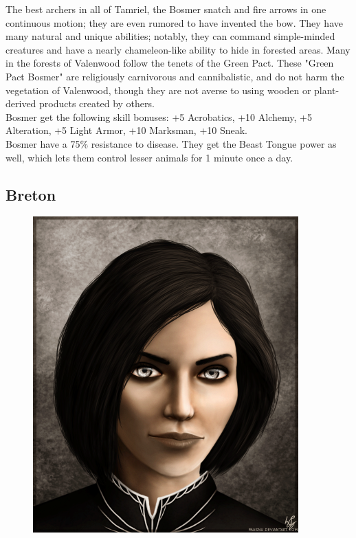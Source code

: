 \documentclass[12pt]{book}
\begin{document}
The best archers in all of Tamriel, the Bosmer snatch and fire arrows in one continuous motion; they are even rumored to have invented the bow. They have many natural and unique abilities; notably, they can command simple-minded creatures and have a nearly chameleon-like ability to hide in forested areas. Many in the forests of Valenwood follow the tenets of the Green Pact. These "Green Pact Bosmer" are religiously carnivorous and cannibalistic, and do not harm the vegetation of Valenwood, though they are not averse to using wooden or plant-derived products created by others.\\

Bosmer get the following skill bonuses: +5 Acrobatics, +10 Alchemy, +5 Alteration, +5 Light Armor, +10 Marksman, +10 Sneak.\\

Bosmer have a 75\% resistance to disease. They get the Beast Tongue power as well, which lets them control lesser animals for 1 minute once a day.

\subsection{Breton}
\begin{figure}
	\includegraphics[width=\textwidth]{Breton.png}
\end{figure}
\end{document}
